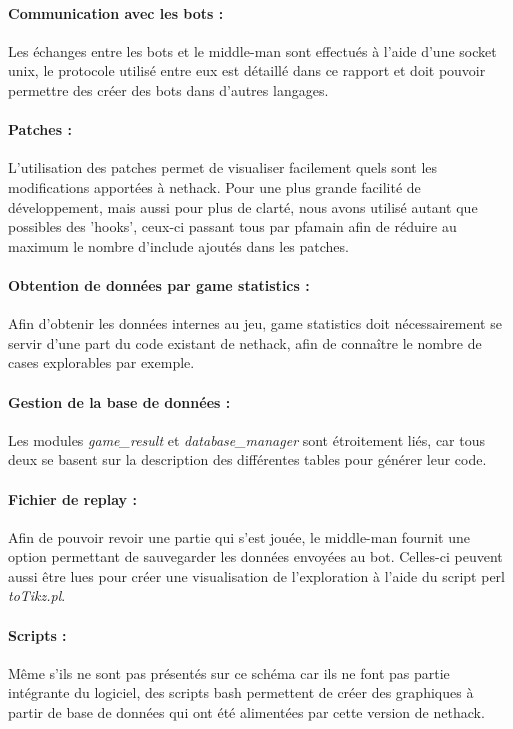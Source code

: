\documentclass[a4paper,12pt]{article}
\begin{document}
\paragraph{Communication avec les bots :}
Les échanges entre les bots et le middle-man sont effectués à l'aide d'une
socket unix, le protocole utilisé entre eux est détaillé dans ce rapport et doit
pouvoir permettre des créer des bots dans d'autres langages.


\paragraph{Patches :}
L'utilisation des patches permet de visualiser facilement quels sont les
modifications apportées à nethack. Pour une plus grande facilité de
développement, mais aussi pour plus de clarté, nous avons utilisé autant que
possibles des 'hooks', ceux-ci passant tous par pfamain afin de réduire au
maximum le nombre d'include ajoutés dans les patches.

\paragraph{Obtention de données par game statistics :}
Afin d'obtenir les données internes au jeu, game statistics doit nécessairement
se servir d'une part du code existant de nethack, afin de connaître le nombre de
cases explorables par exemple.

\paragraph{Gestion de la base de données :}
Les modules {\em game\_result} et {\em database\_manager} sont étroitement
liés, car tous deux se basent sur la description des différentes tables pour
générer leur code.

\paragraph{Fichier de replay :}
Afin de pouvoir revoir une partie qui s'est jouée, le middle-man fournit une
option permettant de sauvegarder les données envoyées au bot. Celles-ci peuvent
aussi être lues pour créer une visualisation de l'exploration à l'aide du script
perl {\em toTikz.pl}.%

\paragraph{Scripts :}
Même s'ils ne sont pas présentés sur ce schéma car ils ne font pas partie
intégrante du logiciel, des scripts bash permettent de créer des graphiques à
partir de base de données qui ont été alimentées par cette version de nethack.
\end{document}
